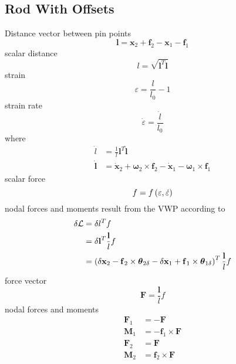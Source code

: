 \documentclass[10pt,dvips,fleqn,subeqn]{report}
\newcommand{\T}[1]{\bm{\mathbf{#1}}}
\begin{document}
\subsection{Rod With Offsets}
Distance vector between pin points
\begin{equation}
	\T{l} = \T{x}_2 + \T{f}_2 - \T{x}_1 - \T{f}_1
\end{equation}
scalar distance
\begin{equation}
	l = \sqrt{\T{l}^T \T{l}}
\end{equation}
strain
\begin{equation}
	\varepsilon = \frac{l}{l_0} - 1
\end{equation}
strain rate
\begin{equation}
	\dot{\varepsilon} = \frac{\dot{l}}{l_0}
\end{equation}
where
\begin{subequations}
\begin{align}
	\dot{l} &= \frac{1}{l} \T{l}^T \dot{\T{l}} \\
	\dot{\T{l}} &= \dot{\T{x}}_2 + \T{\omega}_2 \times \T{f}_2
		- \dot{\T{x}}_1 - \T{\omega}_1 \times \T{f}_1
\end{align}
\end{subequations}
scalar force
\begin{equation}
	f = f\left( \varepsilon, \dot{\varepsilon} \right)
\end{equation}
nodal forces and moments result from the VWP according to
\begin{subequations}
\begin{align}
	\delta \mathcal{L} &= \delta l^T f \\
	&= \delta\T{l}^T \frac{\T{l}}{l} f \\
	&= \plbr{
		\delta\T{x}_2
		- \T{f}_2 \times \T{\theta}_{2\delta}
		- \delta\T{x}_1
		+ \T{f}_1 \times \T{\theta}_{1\delta}
	}^T \frac{\T{l}}{l} f
\end{align}
\end{subequations}
force vector
\begin{equation}
	\T{F} = \frac{\T{l}}{l} f
\end{equation}
nodal forces and moments
\begin{subequations}
\begin{align}
	\T{F}_1 &= -\T{F} \\
	\T{M}_1 &= -\T{f}_1 \times \T{F} \\
	\T{F}_2 &= \T{F} \\
	\T{M}_2 &= \T{f}_2 \times \T{F}
\end{align}
\end{subequations}
\end{document}
